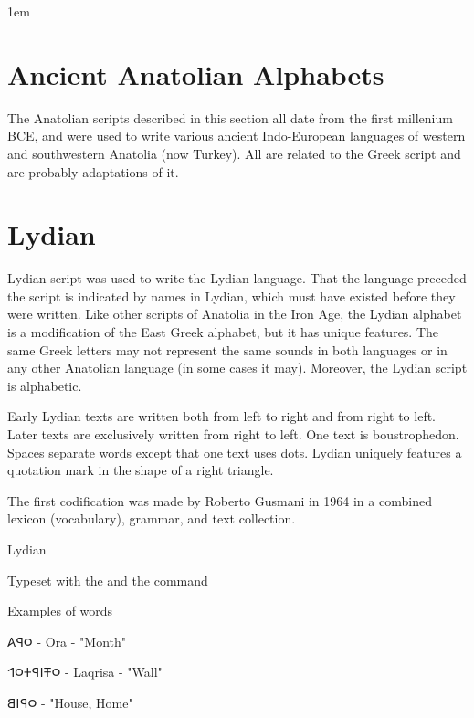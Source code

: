 \newfontfamily{}
\large\brill
\parindent1em
\parskip10pt

\section{Ancient Anatolian Alphabets}
\label{s:anatolian}
The Anatolian scripts described in this section all date from the first millenium BCE, and were used to write various ancient Indo-European languages of western and southwestern Anatolia (now Turkey). All are related to the Greek script and are probably adaptations of it. 



\section{Lydian}
\label{sec:lydian}
 Lydian script was used to write the Lydian language. That the language preceded the script is indicated by names in Lydian, which must have existed before they were written. Like other scripts of Anatolia in the Iron Age, the Lydian alphabet is a modification of the East Greek alphabet, but it has unique features. The same Greek letters may not represent the same sounds in both languages or in any other Anatolian language (in some cases it may). Moreover, the Lydian script is alphabetic.



Early Lydian texts are written both from left to right and from right to left. Later texts are exclusively written from right to left. One text is boustrophedon. Spaces separate words except that one text uses dots. Lydian uniquely features a quotation mark in the shape of a right triangle.

The first codification was made by Roberto Gusmani in 1964 in a combined lexicon (vocabulary), grammar, and text collection.

\begin{scriptexample}[]{Lydian}

\medskip

Typeset with the  and the command \cmd{\lydian}
\end{scriptexample}

Examples of words

\bgroup\lydian
𐤬𐤭𐤠  - Ora - "Month"

𐤬𐤳𐤦𐤭𐤲𐤬𐤩  - Laqrisa - "Wall"

𐤬𐤭𐤦𐤡  - "House, Home"

\egroup

